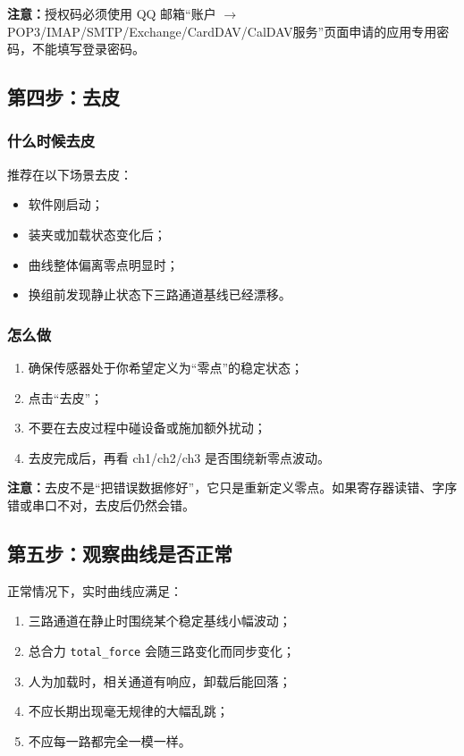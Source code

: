 \documentclass[11pt,a4paper]{ctexart}
\begin{document}
\textbf{注意：}授权码必须使用 QQ 邮箱“账户 $\rightarrow$ POP3/IMAP/SMTP/Exchange/CardDAV/CalDAV服务”页面申请的应用专用密码，不能填写登录密码。

\subsection{第四步：去皮}

\subsubsection{什么时候去皮}

推荐在以下场景去皮：
\begin{itemize}[leftmargin=2em]
  \item 软件刚启动；
  \item 装夹或加载状态变化后；
  \item 曲线整体偏离零点明显时；
  \item 换组前发现静止状态下三路通道基线已经漂移。
\end{itemize}

\subsubsection{怎么做}

\begin{enumerate}[leftmargin=2em]
  \item 确保传感器处于你希望定义为“零点”的稳定状态；
  \item 点击“去皮”；
  \item 不要在去皮过程中碰设备或施加额外扰动；
  \item 去皮完成后，再看 ch1/ch2/ch3 是否围绕新零点波动。
\end{enumerate}

\textbf{注意：}去皮不是“把错误数据修好”，它只是重新定义零点。如果寄存器读错、字序错或串口不对，去皮后仍然会错。

\subsection{第五步：观察曲线是否正常}

正常情况下，实时曲线应满足：

\begin{enumerate}[leftmargin=2em]
  \item 三路通道在静止时围绕某个稳定基线小幅波动；
  \item 总合力 \texttt{total\_force} 会随三路变化而同步变化；
  \item 人为加载时，相关通道有响应，卸载后能回落；
  \item 不应长期出现毫无规律的大幅乱跳；
  \item 不应每一路都完全一模一样。
\end{enumerate}
\end{document}
